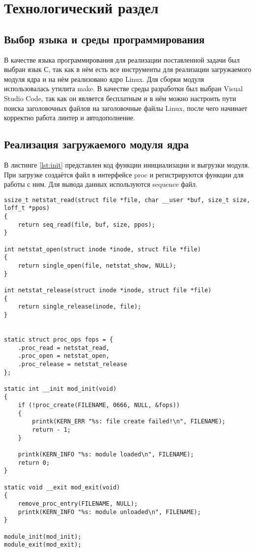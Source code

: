 \chapter{Технологический раздел}

\section{Выбор языка и среды программирования}

В качестве языка программирования для реализации поставленной задачи был выбран язык С, так как в нём есть все инструменты для реализации загружаемого модуля ядра и на нём реализовано ядро Linux. Для сборки модуля использовалась утилита make. В качестве среды разработки был выбран Visual Studio Code, так как он является бесплатным и в нём можно настроить пути поиска заголовочных файлов на заголовочные файлы Linux, после чего начинает корректно работа линтер и автодополнение.

\section{Реализация загружаемого модуля ядра}

В листинге \ref{lst:init} представлен код функции инициализации и выгрузки модуля. При загрузке создаётся файл в интерфейсе proc и регистрируются функции для работы с ним. Для вывода данных используются sequence файл.
 
\begin{center}
	\captionsetup{justification=raggedright,singlelinecheck=off}
	\begin{lstlisting}[label=lst:init,caption=Функции инциализации и выгрузки модуля ,showstringspaces=false]
ssize_t netstat_read(struct file *file, char __user *buf, size_t size, loff_t *ppos)
{	
	return seq_read(file, buf, size, ppos);
}

int netstat_open(struct inode *inode, struct file *file)
{
	return single_open(file, netstat_show, NULL);
}

int netstat_release(struct inode *inode, struct file *file)
{
	return single_release(inode, file);
}


static struct proc_ops fops = {
	.proc_read = netstat_read,
	.proc_open = netstat_open,
	.proc_release = netstat_release
};

static int __init mod_init(void)
{
	if (!proc_create(FILENAME, 0666, NULL, &fops))
	{
		printk(KERN_ERR "%s: file create failed!\n", FILENAME);
		return - 1;
	}
	
	printk(KERN_INFO "%s: module loaded\n", FILENAME);
	return 0;
}

static void __exit mod_exit(void)
{
	remove_proc_entry(FILENAME, NULL);
	printk(KERN_INFO "%s: module unloaded\n", FILENAME);
}

module_init(mod_init);
module_exit(mod_exit);
	\end{lstlisting}
\end{center}
\FloatBarrier

